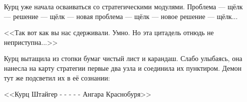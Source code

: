 \documentclass[a4paper,10pt,fleqn]{book}\usepackage{polyglossia}\setdefaultlanguage[babelshorthands=true]{russian}\setotherlanguage{english}\defaultfontfeatures{Ligatures=TeX,Mapping=tex-text}\usepackage{xcolor}\newcommand{\ml}[3]{#2}
\begin{document}
Курц уже начала осваиваться со стратегическими модулями.
Проблема --- щёлк --- решение --- щёлк --- новая проблема --- щёлк --- новое решение --- щёлк...

<<Так вот как вы нас сдерживали.
Умно.
Но эта цитадель отнюдь не неприступна...>>

Курц вытащила из стопки бумаг чистый лист и карандаш.
Слабо улыбаясь, она нанесла на карту стратегии первые два узла и соединила их пунктиром.
\ml{$0$}
{Демон тут же подсветил их в её сознании:}
{The daemon immediately highlighted them in her mind:}

\ml{$0$}
{<<Курц Штайгер - - - - - Ангара Краснобуря>>}
{\textit{Kurz Steiger - - - - - Angara of Redbreeze}}
\end{document}
